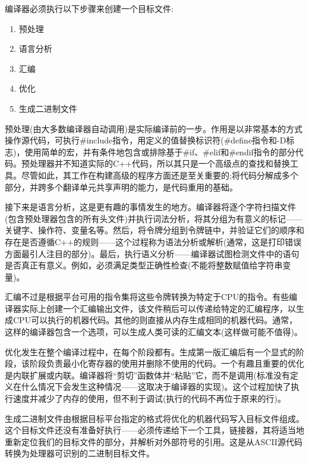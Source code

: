 编译器必须执行以下步骤来创建一个目标文件:

\begin{enumerate}
\item 
预处理

\item 
语言分析

\item 
汇编

\item 
优化

\item 
生成二进制文件
\end{enumerate}

预处理(由大多数编译器自动调用)是实际编译前的一步。作用是以非常基本的方式操作源代码，可执行\#include指令，用定义的值替换标识符(\#define指令和-D标志)，使用简单的宏，并有条件地包含或排除基于\#if、\#elif和\#endif指令的部分代码。预处理器并不知道实际的C++代码，所以其只是一个高级点的查找和替换工具。尽管如此，其工作在构建高级的程序方面还是至关重要的;将代码分解成多个部分，并跨多个翻译单元共享声明的能力，是代码重用的基础。

接下来是语言分析，这是更有趣的事情发生的地方。编译器将逐个字符扫描文件(包含预处理器包含的所有头文件)并执行词法分析，将其分组为有意义的标记——关键字、操作符、变量名等。然后，将令牌分组到令牌链中，并验证它们的顺序和存在是否遵循C++的规则——这个过程称为语法分析或解析(通常，这是打印错误方面最引人注目的部分)。最后，执行语义分析——编译器试图检测文件中的语句是否真正有意义。例如，必须满足类型正确性检查(不能将整数赋值给字符串变量)。

汇编不过是根据平台可用的指令集将这些令牌转换为特定于CPU的指令。有些编译器实际上创建一个汇编输出文件，该文件稍后可以传递给特定的汇编程序，以生成CPU可以执行的机器代码。其他的则直接从内存生成相同的机器代码。通常，这样的编译器包含一个选项，可以生成人类可读的汇编文本(这样做可能不值得)。

优化发生在整个编译过程中，在每个阶段都有。生成第一版汇编后有一个显式的阶段，该阶段负责最小化寄存器的使用并删除不使用的代码。一个有趣且重要的优化是内联扩展或内联。编译器将“剪切”函数体并“粘贴”它，而不是调用(标准没有定义在什么情况下会发生这种情况——这取决于编译器的实现)。这个过程加快了执行速度并减少了内存的使用，但不利于调试(执行的代码不再位于原来的行)。

生成二进制文件由根据目标平台指定的格式将优化的机器代码写入目标文件组成。这个目标文件还没有准备好执行——必须传递给下一个工具，链接器，其将适当地重新定位我们的目标文件的部分，并解析对外部符号的引用。这是从ASCII源代码转换为处理器可识别的二进制目标文件。


